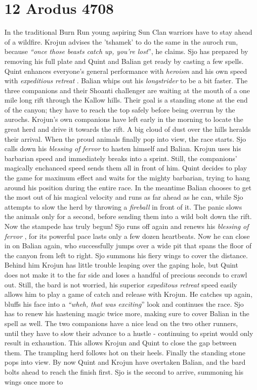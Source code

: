 \section{12 Arodus 4708}

In the traditional Burn Run young aspiring Sun Clan warriors have to stay ahead of a wildfire. Krojun advises the 'tshamek' to do the same in the auroch run, because {\itshape``once those beasts catch up, you're lost}'', he claims. Sjo has prepared by removing his full plate and Quint and Balian get ready by casting a few spells. Quint enhances everyone's general performance with {\itshape heroism} and his own speed with  {\itshape expeditious retreat} . Balian whips out his  {\itshape longstrider} to be a bit faster. The three companions and their Shoanti challenger are waiting at the mouth of a one mile long rift through the Kallow hills. Their goal is a standing stone at the end of the canyon; they have to reach the top safely before being overrun by the aurochs. Krojun's own companions have left early in the morning to locate the great herd and drive it towards the rift. A big cloud of dust over the hills heralds their arrival. When the proud animals finally pop into view, the race starts. Sjo calls down his {\itshape blessing of fervor} to hasten himself and Balian. Krojun uses his barbarian speed and immediately breaks into a sprint. Still, the companions' magically enchanced speed sends them all in front of him. Quint decides to play the game for maximum effect and waits for the mighty barbarian, trying to hang around his position during the entire race. In the meantime Balian chooses to get the most out of his magical velocity and runs as far ahead as he can, while Sjo attempts to slow the herd by throwing a  {\itshape fireball} in front of it. The panic slows the animals only for a second, before sending them into a wild bolt down the rift. Now the stampede has truly begun! Sjo runs off again and renews his {\itshape blessing of fervor} , for its powerful pace lasts only a few dozen heartbeats. Now he can close in on Balian again, who successfully jumps over a wide pit that spans the floor of the canyon from left to right. Sjo summons his fiery wings to cover the distance. Behind him Krojun has little trouble leaping over the gaping hole, but Quint does not make it to the far side and loses a handful of precious seconds to crawl out. Still, the bard is not worried, his superior  {\itshape expeditous retreat} speed easily allows him to play a game of catch and release with Krojun. He catches up again, bluffs his face into a {\itshape``wheh, that was exciting}'' look and continues the race. Sjo has to renew his hastening magic twice more, making sure to cover Balian in the spell as well. The two companions have a nice lead on the two other runners, until they have to slow their advance to a hustle - continuing to sprint would only result in exhaustion. This allows Krojun and Quint to close the gap between them. The trampling herd follows hot on their heels. Finally the standing stone pops into view. By now Quint and Krojun have overtaken Balian, and the bard bolts ahead to reach the finish first. Sjo is the second to arrive, summoning his wings once more to 